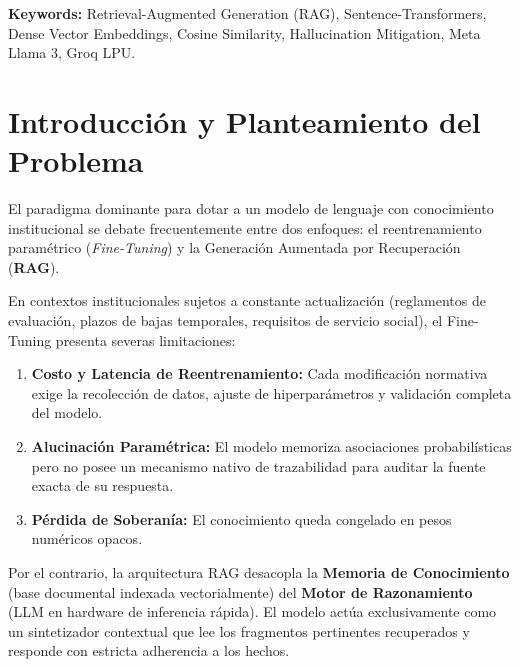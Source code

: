 \documentclass[12pt,letterpaper]{article}
\begin{document}
\vspace{0.5cm}
\noindent\textbf{Keywords:} Retrieval-Augmented Generation (RAG), Sentence-Transformers, Dense Vector Embeddings, Cosine Similarity, Hallucination Mitigation, Meta Llama 3, Groq LPU.

\newpage
\tableofcontents
\newpage
{}

\section{Introducción y Planteamiento del Problema}

El paradigma dominante para dotar a un modelo de lenguaje con conocimiento institucional se debate frecuentemente entre dos enfoques: el reentrenamiento paramétrico (\textit{Fine-Tuning}) y la Generación Aumentada por Recuperación (\textbf{RAG}). 

En contextos institucionales sujetos a constante actualización (reglamentos de evaluación, plazos de bajas temporales, requisitos de servicio social), el Fine-Tuning presenta severas limitaciones:
\begin{enumerate}
    \item \textbf{Costo y Latencia de Reentrenamiento:} Cada modificación normativa exige la recolección de datos, ajuste de hiperparámetros y validación completa del modelo.
    \item \textbf{Alucinación Paramétrica:} El modelo memoriza asociaciones probabilísticas pero no posee un mecanismo nativo de trazabilidad para auditar la fuente exacta de su respuesta.
    \item \textbf{Pérdida de Soberanía:} El conocimiento queda congelado en pesos numéricos opacos.
\end{enumerate}

Por el contrario, la arquitectura RAG desacopla la \textbf{Memoria de Conocimiento} (base documental indexada vectorialmente) del \textbf{Motor de Razonamiento} (LLM en hardware de inferencia rápida). El modelo actúa exclusivamente como un sintetizador contextual que lee los fragmentos pertinentes recuperados y responde con estricta adherencia a los hechos.

\end{document}
